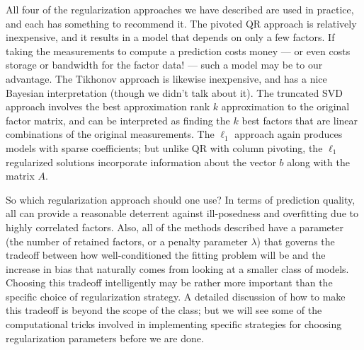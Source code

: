 \documentclass[12pt, leqno]{article} %
\begin{document}
All four of the regularization approaches we have described are used
in practice, and each has something to recommend it.  The pivoted QR
approach is relatively inexpensive, and it results in a model that
depends on only a few factors.  If taking the measurements to compute
a prediction costs money --- or even costs storage or bandwidth for
the factor data! --- such a model may be to our advantage.  The
Tikhonov approach is likewise inexpensive, and has a nice Bayesian
interpretation (though we didn't talk about it).  The truncated SVD
approach involves the best approximation rank $k$ approximation to the
original factor matrix, and can be interpreted as finding the $k$ best
factors that are linear combinations of the original measurements.
The $\ell_1$ approach again produces models with sparse coefficients;
but unlike QR with column pivoting, the $\ell_1$ regularized solutions
incorporate information about the vector $b$ along with the matrix $A$.

So which regularization approach should one use?  In terms of
prediction quality, all can provide a reasonable deterrent against
ill-posedness and overfitting due to highly correlated factors.  Also,
all of the methods described have a parameter (the number of retained
factors, or a penalty parameter $\lambda$) that governs the tradeoff
between how well-conditioned the fitting problem will be and the
increase in bias that naturally comes from looking at a smaller class
of models.  Choosing this tradeoff intelligently may be rather more
important than the specific choice of regularization strategy.  A
detailed discussion of how to make this tradeoff is beyond the scope
of the class; but we will see some of the computational tricks
involved in implementing specific strategies for choosing
regularization parameters before we are done.
\end{document}
